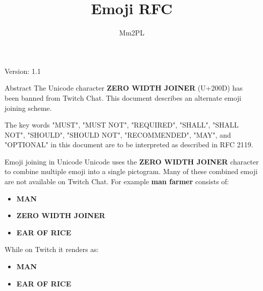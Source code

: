 \documentclass[a4paper]{article}
\author {Mm2PL}
\title {Emoji RFC}
\newcommand\ZWJ{\textbf{ZERO WIDTH JOINER}}
\begin{document}
    \maketitle
    \begin{center}
        \small{Version: 1.1}
    \end{center}

    \begin{section}{Abstract}
        The Unicode character \ZWJ{} (U+200D) has been banned from Twitch Chat.
        This document describes an alternate emoji joining scheme.

        The key words "MUST", "MUST NOT", "REQUIRED", "SHALL", "SHALL NOT",
        "SHOULD", "SHOULD NOT", "RECOMMENDED",  "MAY", and "OPTIONAL" in this
        document are to be interpreted as described in RFC 2119.
    \end{section}
    \begin{section}{Emoji joining in Unicode}
        Unicode uses the \ZWJ{} character to combine
        multiple emoji into a single pictogram. Many of these combined emoji
        are not available on Twitch Chat. For example \textbf{man farmer} consists of:
        \begin{itemize}
            \item \textbf{MAN}
            \item \textbf{ZERO WIDTH JOINER}
            \item \textbf{EAR OF RICE}
        \end{itemize}
        
        While on Twitch it renders as:
        \begin{itemize}
            \item \textbf{MAN}
            \item \textbf{EAR OF RICE}
        \end{itemize}
    \end{section}
\end{document}
